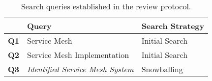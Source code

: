 \begin{table}[t]
\centering
    \begin{tabularx}{\linewidth}{lXl}
    \toprule
     & Query & Search Strategy \\
    
    \midrule
    \textbf{Q1} & Service Mesh & Initial Search \\
    \textbf{Q2} & Service Mesh Implementation & Initial Search \\

    \midrule
    \textbf{Q3} & \textit{Identified Service Mesh System} & Snowballing  \\
    
    \bottomrule
    \end{tabularx}
\caption{Search queries established in the review protocol.}
\label{tab:search-queries}
\end{table}

    

    
